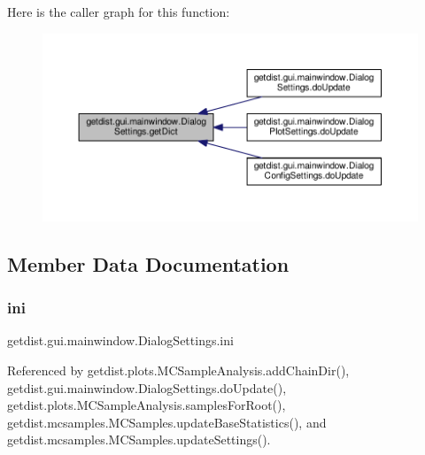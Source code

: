 Here is the caller graph for this function\+:
\nopagebreak
\begin{figure}[H]
\begin{center}
\leavevmode
\includegraphics[width=350pt]{classgetdist_1_1gui_1_1mainwindow_1_1DialogSettings_af11876f1336ee99c94531fbe9c939775_icgraph}
\end{center}
\end{figure}


\subsection{Member Data Documentation}
\mbox{\label{classgetdist_1_1gui_1_1mainwindow_1_1DialogSettings_a5eff370784314808c5cc2ece100d4615}} 
\subsubsection{\texorpdfstring{ini}{ini}}
{\footnotesize\ttfamily getdist.\+gui.\+mainwindow.\+Dialog\+Settings.\+ini}



Referenced by getdist.\+plots.\+M\+C\+Sample\+Analysis.\+add\+Chain\+Dir(), getdist.\+gui.\+mainwindow.\+Dialog\+Settings.\+do\+Update(), getdist.\+plots.\+M\+C\+Sample\+Analysis.\+samples\+For\+Root(), getdist.\+mcsamples.\+M\+C\+Samples.\+update\+Base\+Statistics(), and getdist.\+mcsamples.\+M\+C\+Samples.\+update\+Settings().

\mbox{\label{classgetdist_1_1gui_1_1mainwindow_1_1DialogSettings_ac5a86b53caa937116ae12c683f065308}} 
